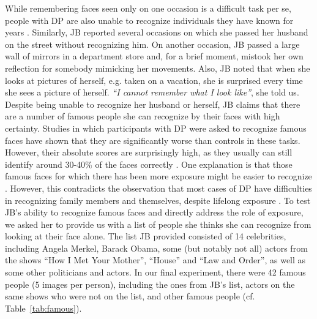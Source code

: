 \documentclass[fleqn,10pt]{SelfArx} %
\begin{document}
While remembering faces seen only on one occasion is a difficult task per se, people with DP are also unable to recognize individuals they have known for years \citep{Ariel_1996, Nunn_2001, Jones_2001, Fine_2011}. Similarly, JB reported several occasions on which she passed her husband on the street without recognizing him. On another occasion, JB passed a large wall of mirrors in a department store and, for a brief moment, mistook her own reflection for somebody mimicking her movements. Also, JB noted that when she looks at pictures of herself, e.g. taken on a vacation, she is surprised every time she sees a picture of herself. \textit{“I cannot remember what I look like”}, she told us.
Despite being unable to recognize her husband or herself, JB claims that there are a number of famous people she can recognize by their faces with high certainty. Studies in which participants with DP were asked to recognize famous faces have shown that they are significantly worse than controls in these tasks. However, their absolute scores are surprisingly high, as they usually can still identify around 30-40\% of the faces correctly \citep{Rivolta_2012, Garrido_2009}. One explanation is that those famous faces for which there has been more exposure might be easier to recognize \citep{Rivolta_2012}. However, this contradicts the observation that most cases of DP have difficulties in recognizing family members and themselves, despite lifelong exposure \citep{Sacks, Nunn_2001, Fine_2011, Duchaine_2011}.
To test JB's ability to recognize famous faces and directly address the role of exposure, we asked her to provide us with a list of people she thinks she can recognize from looking at their face alone. The list JB provided consisted of 14 celebrities, including Angela Merkel, Barack Obama, some (but notably not all) actors from the shows “How I Met Your Mother”, “House” and “Law and Order”, as well as some other politicians and actors. In our final experiment, there were 42 famous people (5 images per person), including the ones from JB's list, actors on the same shows who were not on the list, and other famous people (cf. Table~\ref{tab:famous}). 
\end{document}

